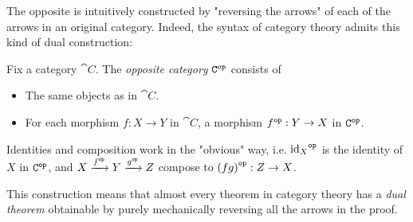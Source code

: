 


The opposite  is intuitively constructed by "reversing the arrows"
of each of the arrows in an original category. Indeed, the syntax of category
theory admits this kind of dual construction:

\begin{dfn*}
	Fix a category $\cat{C}$. The \emph{opposite category} ${{{\normalfont\texttt{C}}}^{{\normalfont\texttt{op}}}}$ consists of
	\begin{itemize}
		\item The same objects as in $\cat{C}$.
		\item For each morphism $f: X\rightarrow Y$ in $\cat{C}$, a morphism
		      ${{f}^{{\normalfont\texttt{op}}}}: Y\rightarrow X$ in ${{{\normalfont\texttt{C}}}^{{\normalfont\texttt{op}}}}$.
	\end{itemize}

	Identities and composition work in the "obvious" way, i.e. ${{\operatorname{id}_X}^{{\normalfont\texttt{op}}}}$ is the
	identity of $X$ in ${{{\normalfont\texttt{C}}}^{{\normalfont\texttt{op}}}}$, and
	$X\xrightarrow{{{f}^{{\normalfont\texttt{op}}}}}Y\xrightarrow{{{g}^{{\normalfont\texttt{op}}}}}Z$ compose to ${{(fg)}^{{\normalfont\texttt{op}}}}:
		Z\rightarrow X$.
\end{dfn*}

This construction means that almost every theorem in category theory has a
\emph{dual theorem} obtainable by purely mechanically reversing all the arrows
in the proof.


